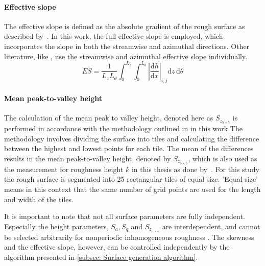 \paragraph{Effective slope}
The effective slope is defined as the absolute gradient of the rough surface as described by~\cite{napoliEffectSlopeIrregularly2008}.
In this work, the full effective slope is employed, which incorporates the slope in both the streamwise and azimuthal directions.
Other literature, like \citep{jellyReynoldsDispersiveShear2018,maDirectNumericalSimulation2021}, use the streamwise and azimuthal effective slope individually.
\begin{equation}
    ES = \frac{1}{L_z L_\theta} \int_0^{L_z} \int_0^{L_\theta} \left| \frac{\mathrm{d}h}{\mathrm{d}x} \right|_{i,j} \mathrm{d}z \, \mathrm{d}\theta
\end{equation}


\paragraph{Mean peak-to-valley height}
The calculation of the mean peak to valley height, denoted here as $S_{z_{5\times 5}}$  is performed  in accordance with the methodology outlined in \cite{thakkarInvestigationTurbulentFlow2017} in this work
The methodology involves dividing  the surface into tiles and calculating the difference between the highest and lowest points for each tile.
The mean of the differences results in  the mean peak-to-valley height, denoted by $S_{z_{5\times 5}}$, which is also used  as the measurement for roughness height $k$ in this thesis as done by~\cite{demaioDirectNumericalSimulation2023}.
For this study the rough surface is segmented into 25 rectangular tiles of equal size.
'Equal size' means in this context that the same number of  grid points are used for the length and width of the tiles.



\medskip

It is important to note that not all surface parameters are fully independent.
Especially the height parameters, $S_a, S_q$ and $S_{z_{5\times 5}}$ are interdependent, and cannot be selected arbitrarily for nonperiodic inhomogeneous roughness \citep{perez-rafolsGeneratingRandomlyRough2019}.
The skewness and the effective slope, however, can be controlled independently by the algorithm presented in \autoref{subsec: Surface generation algorithm}.

